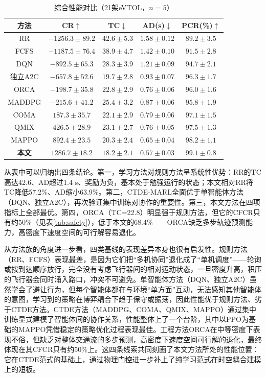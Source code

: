 \documentclass[12pt,a4paper,UTF8]{ctexart}
\begin{document}
\begin{table}[H]
    \centering
    \caption{综合性能对比（21架eVTOL，$n=5$）}
    \label{tab:comparison}
    \begin{tabular}{|c|c|c|c|c|}
        \hline
        \textbf{方法} & \textbf{CR$\uparrow$} & \textbf{TC$\downarrow$} & \textbf{AD(s)$\downarrow$} & \textbf{PCR(\%)$\uparrow$} \\
        \hline
        RR & $-1256.3\pm89.2$ & $42.6\pm5.3$ & $1.58\pm0.12$ & $89.2\pm3.5$ \\
        FCFS & $-1187.5\pm76.4$ & $38.9\pm4.7$ & $1.42\pm0.10$ & $91.5\pm2.8$ \\
        DQN & $-892.5\pm65.3$ & $28.3\pm3.9$ & $1.21\pm0.09$ & $94.7\pm2.1$ \\
        独立A2C & $-657.8\pm52.6$ & $19.7\pm2.8$ & $0.93\pm0.07$ & $96.3\pm1.7$ \\
        ORCA & $-198.7\pm35.8$ & $22.8\pm2.9$ & $0.76\pm0.06$ & $96.0\pm1.6$ \\
        MADDPG & $-215.6\pm41.2$ & $25.4\pm3.2$ & $0.87\pm0.06$ & $95.8\pm1.9$ \\
        COMA & $187.3\pm35.7$ & $22.1\pm2.9$ & $0.79\pm0.06$ & $97.1\pm1.5$ \\
        QMIX & $426.5\pm28.9$ & $23.1\pm2.7$ & $0.76\pm0.05$ & $97.5\pm1.3$ \\
        MAPPO & $892.4\pm23.5$ & $20.3\pm2.4$ & $0.65\pm0.04$ & $98.2\pm1.1$ \\
        \textbf{本文} & $\mathbf{1286.7\pm18.2}$ & $\mathbf{18.2\pm2.1}$ & $\mathbf{0.57\pm0.03}$ & $\mathbf{99.1\pm0.8}$ \\
        \hline
    \end{tabular}
\end{table}

从表中可以归纳出四条结论。第一，学习方法对规则方法呈系统性优势：RR的TC高达42.6、AD超过1.4 s、奖励为负，基本处于勉强运行的状态；本文相对RR将TC降低57.2\%、AD缩小63.9\%。第二，CTDE-MARL全面优于单智能体方法（DQN、独立A2C），再次验证集中训练对协作的重要性。第三，本文方法在四项指标上全部最优。第四，ORCA（TC=22.8）明显强于规则方法，但它的CFCR只有约50\%（见表\ref{tab:safety}），低于本文的68.4\%——ORCA缺乏多步轨迹预测能力，高密度下速度空间的可行解容易退化。

从方法族的角度进一步看，四类基线的表现差异本身也很有启发性。规则方法（RR、FCFS）表现最差，是因为它们把“多机协同”退化成了“单机调度”——轮询或按到达顺序放行，完全没有考虑飞行器间的相对运动状态，一旦密度升高，积压的飞行器会同时涌入路口，冲突不可避免。单智能体方法（DQN、独立A2C）虽然学会了避让行为，但每个智能体都在与环境“单方面”互动，无法感知其他智能体的意图，学习到的策略在博弈耦合下趋于保守或振荡，因此性能优于规则方法、劣于CTDE方法。CTDE方法（MADDPG、COMA、QMIX、MAPPO）通过集中训练显式建模了智能体间的协作关系，性能整体上了一个台阶，其中以PPO为基础的MAPPO凭借稳定的策略优化过程表现最佳。工程方法ORCA在中等密度下表现不俗，但缺乏对整体交通流的多步预测，高密度下速度空间可行解的退化，最终体现在其CFCR只有约50\%上。这四条线索共同刻画了本文方法所处的性能位置：它在CTDE范式的基础上，通过物理门控进一步补上了纯学习范式在时空耦合建模上的短板。
\end{document}

